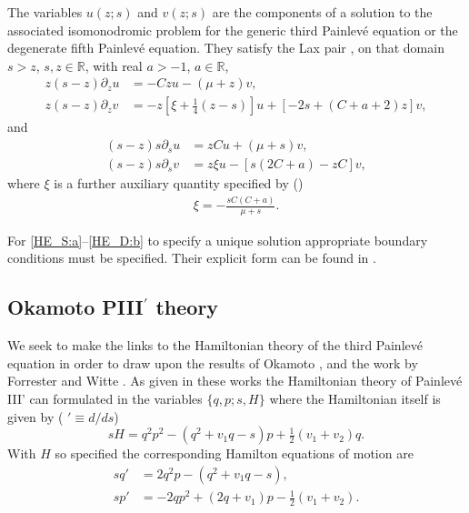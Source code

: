 \documentclass[10pt,reqno]{amsart}
\theoremstyle{plain}
\theoremstyle{definition}
\theoremstyle{remark}
\begin{document}
The variables $u(z;s)$ and $v(z;s)$ are the components of a solution to the associated isomonodromic problem for the
generic third Painlev\'e equation or the degenerate fifth Painlev\'e equation. They satisfy the Lax pair \cite[Eqs~(5.34-7)]{FW_2007},
on that domain $s>z$, $s,z \in \mathbb{R}$, with real $a>-1$, $a\in \mathbb{R}$,
\begin{align}
 z(s-z)\partial_{z}u & = -C z u-(\mu +z)v,
\label{HE_S:a}\\
 z(s-z)\partial_{z}v & = -z\left[\xi +\tfrac{1}{4}(z-s)\right] u+[-2s+(C+a+2)z]v ,
\label{HE_S:b} 
\end{align}
and
\begin{align}
  (s-z)s\partial_su & =  zCu+(\mu+s)v ,
\label{HE_D:a} \\
  (s-z)s\partial_sv & = z\xi u-[s(2C+a)-zC]v ,
\label{HE_D:b}
\end{align}
where $\xi$ is a further auxiliary quantity specified by (\cite[Eq.~(5.19)]{FW_2007})
\begin{align}
   \xi = -\frac{sC(C+a)}{\mu+s}.        
\label{HE_xidefn}    
\end{align}

For \eqref{HE_S:a}--\eqref{HE_D:b} to specify a unique solution appropriate boundary conditions must 
be specified. Their explicit form can be found in \cite{FW_2007}.
 
\subsection{Okamoto PIII$^{\prime}$ theory} 
 We seek to make the links to the Hamiltonian theory of the third Painlev\'e equation in order to draw upon the results of Okamoto \cite{Ok_1987c}, 
\cite{Ok_1987b} and the work by Forrester and Witte \cite{FW_2002a}. As given in these works the Hamiltonian theory of Painlev\'e III' can formulated in the 
variables $ \{q,p;s,H\} $ where the Hamiltonian itself is given by ( $ ' \equiv d/ds $)
\begin{equation}
  sH = q^2 p^2 - (q^2 + v_1q - s)p + \tfrac{1}{2}(v_1 + v_2) q.
\label{HIII}
\end{equation} 
With $H$ so specified the corresponding Hamilton equations of motion are
\begin{align}
  sq' & = 2q^2p - (q^2 + v_1 q - s) ,
\label{EoMIII:a}\\
  sp' & = -2qp^2+(2q+v_1)p-\tfrac{1}{2}(v_1+v_2) .
\label{EoMIII:b}
\end{align}
\end{document}
